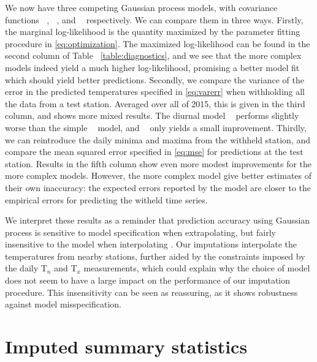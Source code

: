 \documentclass[letter]{article}
\newcommand{\T}{\mathrm{T}}
\newcommand{\Tn}{\T_{n}}
\newcommand{\Tx}{\T_{x}}
\DeclareMathOperator{\kSESE}{k_{\mathtt{SExSE}}}
\DeclareMathOperator{\kdiurn}{k_{\mathtt{SESE_{24}}}}
\DeclareMathOperator{\ksumprod}{k_{\mathtt{sumprod}}}
\renewcommand{\cite}[1]{\citep{#1}}
\begin{document}
We now have three competing Gaussian process models, with covariance functions \(\kSESE\), \(\kdiurn\), and \(\ksumprod\) respectively. We can compare them in three ways.
Firstly, the marginal log-likelihood is the quantity maximized by the parameter fitting procedure in \eqref{eq:optimization}.
The maximized log-likelihood can be found in the second column of Table~ \ref{table:diagnostics}, and we see that the more complex models indeed yield a much higher log-likelihood, promising a better model fit which should yield better predictions.
Secondly, we compare the variance of the error in the predicted temperatures specified in \eqref{eq:varerr} when withholding all the data from a test station. Averaged over all of 2015, this is given in the third column, and shows more mixed results.
The diurnal model \(\kdiurn\) performs slightly worse than the simple \(\kSESE\) model, and \(\ksumprod\) only yields a small improvement.
Thirdly, we can reintroduce the daily minima and maxima from the withheld station, and compare the mean squared error specified in \eqref{eq:mse} for predictions at the test station. Results in the fifth column show even more modest improvements for the more complex models.
However, the more complex model give better estimates of their own inaccuracy: the expected errors reported by the model are closer to the empirical errors for predicting the witheld time series.


We interpret these results as a reminder that prediction accuracy using Gaussian process is sensitive to model specification when extrapolating, but fairly insensitive to the model when interpolating \cite{stein2012interpolation}.
Our imputations interpolate the temperatures from nearby stations, further aided by the constraints imposed by the daily \(\Tn\) and \(\Tx\) measurements, which could explain why the choice of model does not seem to have a large impact on the performance of our imputation procedure.
This insensitivity can be seen as reassuring, as it shows robustness against model misspecification.

        \section{Imputed summary statistics}\label{imputed-summary-statistics}
    
\end{document}
